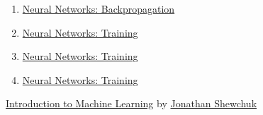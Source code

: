 \documentclass[11pt]{article}
\begin{document}
\begin{enumerate}
	\item  \href{https://mp.weixin.qq.com/s/Ve5Vv0NxuD0qYITl5ow8cA}{Neural Networks: Backpropagation } %
	\item  \href{https://mp.weixin.qq.com/s/OeRhOKjtDzCsN_aBkq4zCg}{Neural Networks: Training } %
	\item  \href{https://mp.weixin.qq.com/s/vqeuHoLCPuSGJEJ9vBTPIg}{Neural Networks: Training } %
	\item  \href{https://mp.weixin.qq.com/s/B1yDsfHLI9ymJtPfXxrnXQ}{Neural Networks: Training } %
\end{enumerate}


\newpage 


\begin{center}
	{\large  \href{https://people.eecs.berkeley.edu/~jrs/189s24/}{Introduction to Machine Learning} by {\large \href{https://people.eecs.berkeley.edu/~jrs/}{Jonathan Shewchuk}}}
\end{center}

\vspace{-0.5cm}
\end{document}
